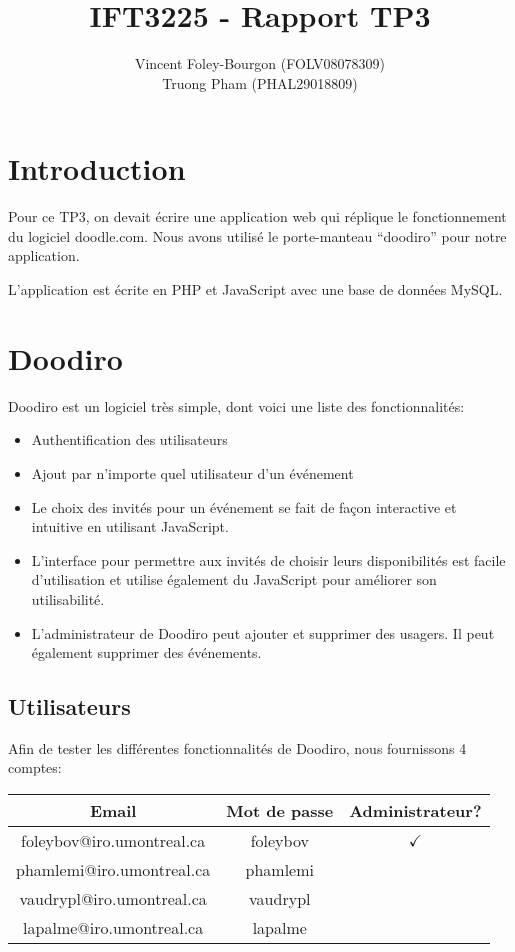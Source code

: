 \documentclass[10pt]{article}
\begin{document}
\title{IFT3225 - Rapport TP3}
\author{Vincent Foley-Bourgon (FOLV08078309) \\
Truong Pham (PHAL29018809)}
\maketitle

\section{Introduction}

Pour ce TP3, on devait écrire une application web qui réplique le
fonctionnement du logiciel doodle.com.  Nous avons utilisé le
porte-manteau ``doodiro'' pour notre application.

L'application est écrite en PHP et JavaScript avec une base de données
MySQL.

\section{Doodiro}

Doodiro est un logiciel très simple, dont voici une liste des
fonctionnalités:

\begin{itemize}
\item Authentification des utilisateurs
\item Ajout par n'importe quel utilisateur d'un événement
\item Le choix des invités pour un événement se fait de façon
  interactive et intuitive en utilisant JavaScript.
\item L'interface pour permettre aux invités de choisir leurs
  disponibilités est facile d'utilisation et utilise également du
  JavaScript pour améliorer son utilisabilité.
\item L'administrateur de Doodiro peut ajouter et supprimer des
  usagers.  Il peut également supprimer des événements.
\end{itemize}

\subsection{Utilisateurs}

Afin de tester les différentes fonctionnalités de Doodiro, nous
fournissons 4 comptes:


\begin{tabular}{|c | c | c |}
  \hline
  Email & Mot de passe & Administrateur? \\
  \hline
  foleybov@iro.umontreal.ca & foleybov & $\checkmark$ \\
  phamlemi@iro.umontreal.ca & phamlemi & ~ \\
  vaudrypl@iro.umontreal.ca & vaudrypl & ~ \\
  lapalme@iro.umontreal.ca & lapalme & ~ \\
  \hline
\end{tabular}
\end{document}
